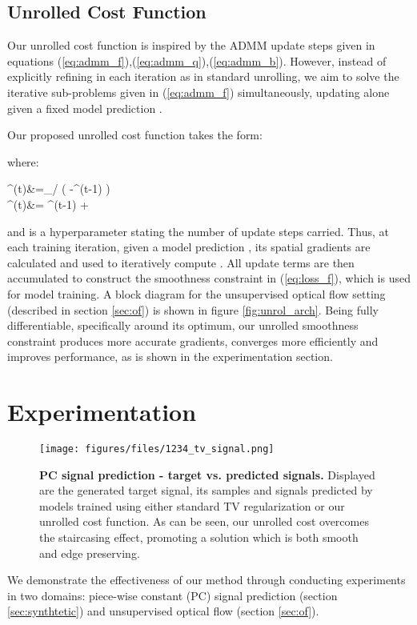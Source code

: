 \documentclass[10pt,twocolumn,letterpaper]{article}
\begin{document}
\subsection{Unrolled Cost Function}
Our unrolled cost function is inspired by the ADMM update steps given in equations (\ref{eq:admm_f}),(\ref{eq:admm_q}),(\ref{eq:admm_b}). However, instead of explicitly refining  in each iteration as in standard unrolling, we aim to solve the iterative sub-problems given in (\ref{eq:admm_f}) simultaneously, updating  alone given a fixed model prediction .

Our proposed unrolled cost function takes the form:

where:

    ^{(t)}&=_{\lambda/\rho} \left( -\boldsymbol{\beta}^{(t-1)} \right) \label{eq:update_q} \\ 
    \boldsymbol{\beta}^{(t)}&= \boldsymbol{\beta}^{(t-1)} + \eta {} \label{eq:update_b}

 and  is a hyperparameter stating the number of update steps carried. Thus, at each training iteration, given a model prediction , its spatial gradients  are calculated and used to iteratively compute . All update terms are then accumulated to construct the smoothness constraint in (\ref{eq:loss_f}), which is used for model training. 
A block diagram for the unsupervised optical flow setting (described in section \ref{sec:of}) is shown in figure \ref{fig:unrol_arch}. Being fully differentiable, specifically around its optimum, our unrolled smoothness constraint produces more accurate  gradients, converges more efficiently and improves performance, as is shown in the experimentation section. \section{Experimentation}
\begin{figure}
\begin{center}
\texttt{[image: figures/files/1234\_tv\_signal.png]}
\end{center}
   \caption{\textbf{PC signal prediction - target vs. predicted signals.}
   Displayed are the generated target signal, its samples and signals predicted by models trained using either standard TV regularization or our unrolled cost function. As can be seen, our unrolled cost overcomes the staircasing effect, promoting a solution which is both smooth and edge preserving.}
\label{fig:toy_sigs}
\end{figure} We demonstrate the effectiveness of our method through conducting experiments in two domains: piece-wise constant (PC) signal prediction (section \ref{sec:synthtetic}) and unsupervised optical flow (section \ref{sec:of}). 
\end{document}
